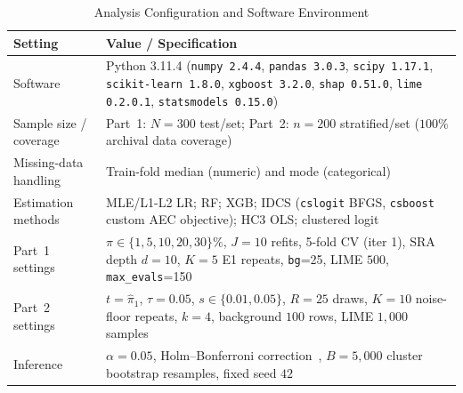 \documentclass[conference]{IEEEtran}
\begin{document}
\begin{table}[!t]
\centering
\caption{Analysis Configuration and Software Environment}
\label{tab:config}
\scriptsize
\renewcommand{\arraystretch}{0.86}
\setlength{\tabcolsep}{3.0pt}
\begin{tabular}{@{}p{2.7cm}p{5.3cm}@{}}
\toprule
\textbf{Setting} & \textbf{Value / Specification} \\
\midrule
Software & Python 3.11.4 (\texttt{numpy 2.4.4}, \texttt{pandas 3.0.3}, \texttt{scipy 1.17.1}, \texttt{scikit-learn 1.8.0}, \texttt{xgboost 3.2.0}, \texttt{shap 0.51.0}, \texttt{lime 0.2.0.1}, \texttt{statsmodels 0.15.0}) \\
Sample size / coverage & Part~1: $N{=}300$ test/set; Part~2: $n{=}200$ stratified/set ($100\%$ archival data coverage) \\
Missing-data handling & Train-fold median (numeric) and mode (categorical) \\
Estimation methods & MLE/L1-L2 LR; RF; XGB; IDCS (\texttt{cslogit} BFGS, \texttt{csboost} custom AEC objective); HC3 OLS; clustered logit \\
Part~1 settings & $\pi \in \{1,5,10,20,30\}\%$, $J{=}10$ refits, 5-fold CV (iter 1), $\mathrm{SRA}$ depth $d{=}10$, $K{=}5$ E1 repeats, \texttt{bg}=25, LIME $500$, \texttt{max\_evals}=150 \\
Part~2 settings & $t{=}\hat{\pi}_1$, $\tau{=}0.05$, $s \in \{0.01,0.05\}$, $R{=}25$ draws, $K{=}10$ noise-floor repeats, $k{=}4$, background $100$ rows, LIME $1{,}000$ samples \\
Inference & $\alpha{=}0.05$, Holm--Bonferroni correction~\cite{holm1979}, $B{=}5{,}000$ cluster bootstrap resamples, fixed seed $42$ \\
\bottomrule
\end{tabular}
\end{table}
\end{document}
